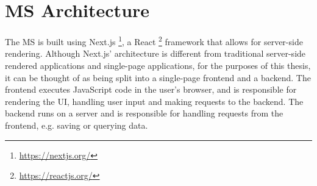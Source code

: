 %



%


\section {MS Architecture}
\label{cha:ms-architecture}

The MS is built using Next.js \footnote{\url{https://nextjs.org/}}, a React \footnote{\url{https://reactjs.org/}}
framework that allows for server-side rendering.
Although Next.js' architecture is different from traditional server-side rendered
applications and single-page applications,
for the purposes of this thesis,
it can be thought of as being split into a single-page frontend and a backend.
The frontend executes JavaScript code in the user's browser, and is
responsible for rendering the UI, handling user input and making requests to the backend.
The backend runs on a server and is responsible for handling requests from the frontend,
e.g. saving or querying data.

